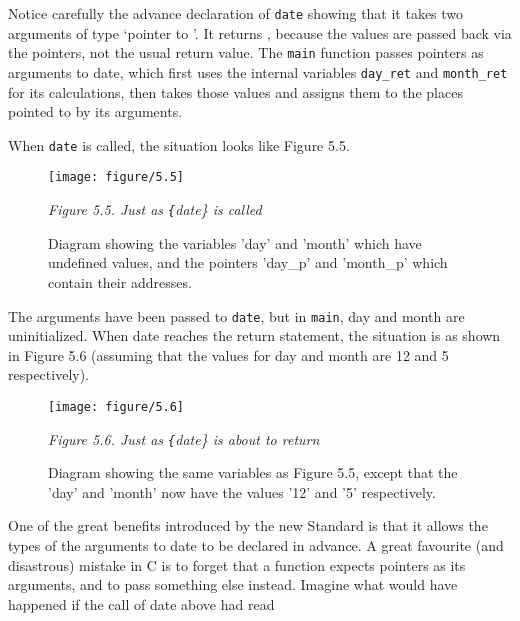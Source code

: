    Notice carefully the advance declaration of \texttt{date} showing
    that it takes two arguments of type `pointer to \kint{}'.
    It returns \void, because the values are passed back via the
    pointers, not the usual return value. The \texttt{main} function
    passes pointers as arguments to date, which first uses the internal
    variables \texttt{day\_ret} and \texttt{month\_ret} for its
    calculations, then takes those values and assigns them to the places
    pointed to by its arguments.


   When \texttt{date} is called, the situation looks like Figure 5.5.


   \begin{figure*}[htb]\centering
     \texttt{[image: figure/5.5]}
     \caption{Diagram showing the variables 'day' and 'month'
       which have undefined values,
       and the pointers 'day\_p' and 'month\_p' which contain their addresses.}
\begin{center}\textit{Figure 5.5. Just as \texttt\{date\} is called}\end{center}
   \end{figure*}



   The arguments have been passed to \texttt{date}, but in
    \texttt{main}, day and month are uninitialized. When date reaches
    the return statement, the situation is as shown in Figure 5.6 (assuming that the values for day and month are 12 and
    5 respectively).


    \begin{figure*}[htb]\centering
      \texttt{[image: figure/5.6]}
      \caption{Diagram showing the same variables as Figure 5.5,
        except that the 'day' and 'month'
        now have the values '12' and '5' respectively.}
\begin{center}\textit{Figure 5.6. Just as \texttt\{date\} is about to return}\end{center}
    \end{figure*}



   One of the great benefits introduced by the new Standard is that it
    allows the types of the arguments to date to be declared in advance.
    A great favourite (and disastrous) mistake in C is to forget that
    a function expects pointers as its arguments, and to pass something else
    instead. Imagine what would have happened if the call of date above had
    read



